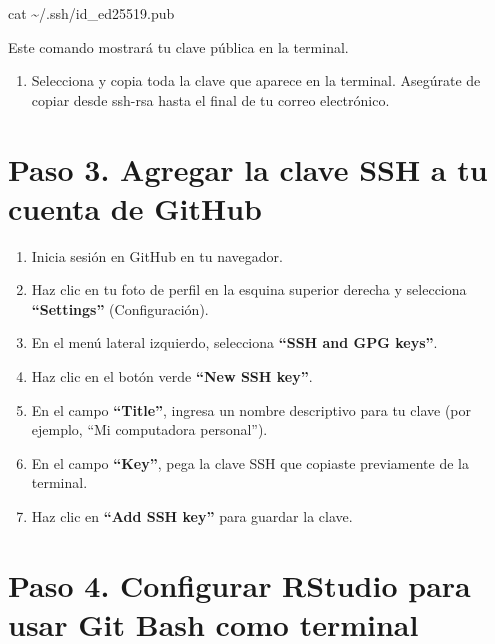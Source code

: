 \documentclass[
  spanish,
  12pt,
  letterpaper,
  DIV=11,
  numbers=noendperiod]{scrreprt}
\newenvironment{Shaded}{\begin{snugshade}}{\end{snugshade}}
\newcommand{\FunctionTok}[1]{\textcolor[rgb]{0.28,0.35,0.67}{#1}}
\newcommand{\NormalTok}[1]{\textcolor[rgb]{0.00,0.23,0.31}{#1}}
\providecommand{\tightlist}{%
  \setlength{\itemsep}{0pt}\setlength{\parskip}{0pt}}
\begin{document}
\begin{Shaded}
\begin{Highlighting}[]
\FunctionTok{cat}\NormalTok{ \textasciitilde{}/.ssh/id\_ed25519.pub}
\end{Highlighting}
\end{Shaded}

Este comando mostrará tu clave pública en la terminal.

\begin{enumerate}
\def\labelenumi{\arabic{enumi}.}
\setcounter{enumi}{2}
\tightlist
\item
  Selecciona y copia toda la clave que aparece en la terminal. Asegúrate
  de copiar desde ssh-rsa hasta el final de tu correo electrónico.
\end{enumerate}

\section{Paso 3. Agregar la clave SSH a tu cuenta de
GitHub}\label{paso-3.-agregar-la-clave-ssh-a-tu-cuenta-de-github}

\begin{enumerate}
\def\labelenumi{\arabic{enumi}.}
\tightlist
\item
  Inicia sesión en GitHub en tu navegador.
\item
  Haz clic en tu foto de perfil en la esquina superior derecha y
  selecciona \textbf{``Settings''} (Configuración).
\item
  En el menú lateral izquierdo, selecciona \textbf{``SSH and GPG
  keys''}.
\item
  Haz clic en el botón verde \textbf{``New SSH key''}.
\item
  En el campo \textbf{``Title''}, ingresa un nombre descriptivo para tu
  clave (por ejemplo, ``Mi computadora personal'').
\item
  En el campo \textbf{``Key''}, pega la clave SSH que copiaste
  previamente de la terminal.
\item
  Haz clic en \textbf{``Add SSH key''} para guardar la clave.
\end{enumerate}

\section{Paso 4. Configurar RStudio para usar Git Bash como
terminal}\label{paso-4.-configurar-rstudio-para-usar-git-bash-como-terminal}
\end{document}
